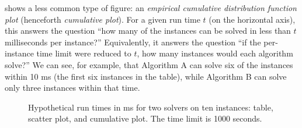  shows a less common type of figure: an
\emph{empirical cumulative distribution function plot} (henceforth
\emph{cumulative plot}). For a given run time $t$ (on the horizontal axis),
this answers the question ``how many of the instances can be solved in less
than $t$ milliseconds per instance?'' Equivalently, it answers the question
``if the per-instance time limit were reduced to $t$, how many instances would
each algorithm solve?''
We can see, for example, that Algorithm A can solve six
of the instances within 10 ms (the first six instances in the table),
while Algorithm B can solve only three instances
within that time.

\begin{figure}[htb]
    \centering
    \caption{Hypothetical run times in ms for two solvers on ten instances: table,
        scatter plot, and cumulative plot. The time limit is 1000 seconds.}
    \label{fig:intro-dummy-figs}
\end{figure}

